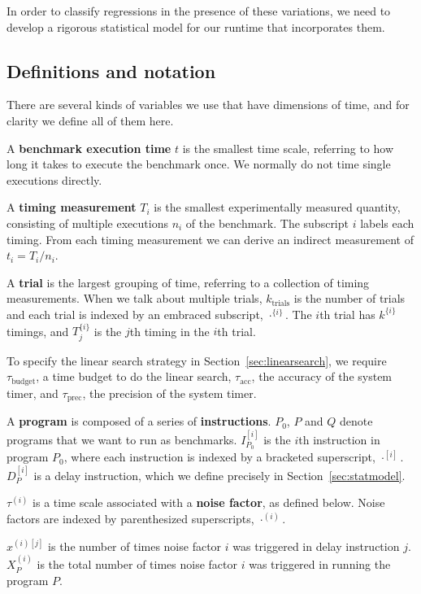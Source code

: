 \documentclass[conference]{IEEEtran}
\begin{document}
In order to classify regressions in the presence of these variations, we need to develop a rigorous statistical model for our runtime that incorporates them.

\subsection{Definitions and notation}

There are several kinds of variables we use that have dimensions of time, and for clarity we define all of them here.

A \textbf{benchmark execution time} $t$ is the smallest time scale, referring to how long it takes to execute the benchmark once. We normally do not time single executions directly.

A \textbf{timing measurement} $T_i$ is the smallest experimentally measured quantity, consisting of multiple executions $n_i$ of the benchmark. The subscript $i$ labels each timing. From each timing measurement we can derive an indirect measurement of $t_i = T_i/n_i$.

A \textbf{trial} is the largest grouping of time, referring to a collection of timing measurements. When we talk about multiple trials, $k_{\textrm{trials}}$ is the number of trials and each trial is indexed by an embraced subscript, $\cdot^{\{i\}}$. The $i$th trial has $k^{\{i\}}$ timings, and $T^{\{i\}}_j$ is the $j$th timing in the $i$th trial.

To specify the linear search strategy in Section~\ref{sec:linearsearch}, we require
$\tau_{\textrm{budget}}$, a time budget to do the linear search,
$\tau_{\textrm{acc}}$, the accuracy of the system timer, and
$\tau_{\textrm{prec}}$, the precision of the system timer.


A \textbf{program} is composed of a series of \textbf{instructions}. $P_0$, $P$ and $Q$ denote programs that we want to run as benchmarks. $I^{[i]}_{P_0}$ is the $i$th instruction in program $P_0$, where each instruction is indexed by a bracketed superscript, $\cdot^{[i]}$. $D^{[i]}_{P}$ is a delay instruction, which we define precisely in Section~\ref{sec:statmodel}.

$\tau^{(i)}$ is a time scale associated with a \textbf{noise factor}, as defined below. Noise factors are indexed by parenthesized superscripts, $\cdot^{(i)}$.

$x^{(i)[j]}$ is the number of times noise factor $i$ was triggered in delay instruction $j$. $X_P^{(i)}$ is the total number of times noise factor $i$ was triggered in running the program $P$.
\end{document}
